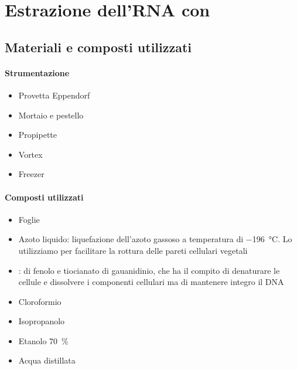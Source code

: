 \section{Estrazione dell'RNA con \trizol}
\subsection{Materiali e composti utilizzati}
\paragraph{Strumentazione}
\begin{itemize}
	\item Provetta \foreignlanguage{german}{Eppendorf}
	\item Mortaio e pestello
	\item Propipette
	\item \foreignlanguage{english}{Vortex}
	\item Freezer
\end{itemize}

\paragraph{Composti utilizzati}
\begin{itemize}
	\item Foglie 
	\item Azoto liquido: liquefazione dell'azoto gassoso a temperatura di \qty{-196}{\celsius}. Lo utilizziamo per facilitare la rottura delle pareti cellulari vegetali
	\item \trizol: \slz di fenolo e tiocianato di gauanidinio, che ha il compito di denaturare le cellule e dissolvere i componenti cellulari ma di mantenere integro il DNA 
	\item Cloroformio
	\item Isopropanolo
	\item Etanolo \qty{70}{\percent}
	\item Acqua distillata
\end{itemize}

